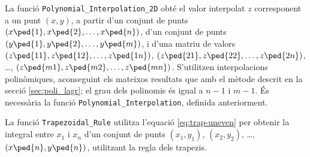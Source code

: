 


La funció \texttt{Polynomial\_Interpolation\_2D} obté el valor interpolat $z$ corresponent a un punt $(x, y)$, a partir d'un conjunt de punts $(x\ped{1}, x\ped{2}, \ldots, x\ped{n})$, d'un conjunt de punts $(y\ped{1}, y\ped{2}, \ldots, y\ped{m})$, i d'una matriu de valors $(z\ped{11}, z\ped{12}, \ldots, z\ped{1n})$,
$(z\ped{21}, z\ped{22}, \ldots, z\ped{2n})$, \ldots, $(z\ped{m1}, z\ped{m2}, \ldots, z\ped{mn})$. S'utilitzen  interpolacions polinòmiques, aconseguint els mateixos resultats que amb el mètode descrit en la secció \vref{sec:poli_lagr}; el grau dels polinomis és igual a $n-1$ i $m-1$.
És necessària la funció \texttt{Polynomial\_Interpolation}, definida anteriorment.




La funció \texttt{Trapezoidal\_Rule} utilitza l'equació  \eqref{eq:trap-uneven} per obtenir la integral entre $x_1$ i $x_n$ d'un conjunt  de punts $(x_1,y_1)$, $(x_2,y_2)$, \ldots, $(x\ped{n},y\ped{n})$, utilitzant la regla dels trapezis.


